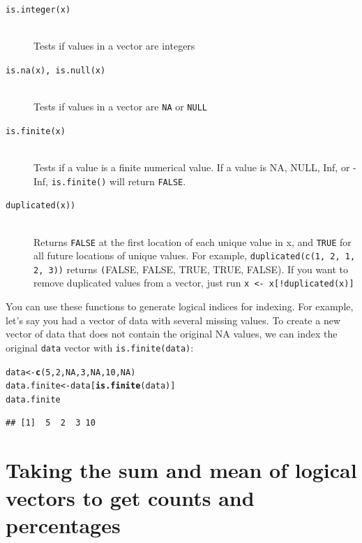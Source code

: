 \documentclass{tufte-book}\usepackage[]{graphicx}\usepackage[]{color}
\makeatletter
\newcommand{\hlnum}[1]{\textcolor[rgb]{0.686,0.059,0.569}{#1}}%
\newcommand{\hlstd}[1]{\textcolor[rgb]{0.345,0.345,0.345}{#1}}%
\newcommand{\hlkwb}[1]{\textcolor[rgb]{0.69,0.353,0.396}{#1}}%
\newcommand{\hlkwd}[1]{\textcolor[rgb]{0.737,0.353,0.396}{\textbf{#1}}}%
\newenvironment{kframe}{%
 \def\at@end@of@kframe{}%
 \ifinner\ifhmode%
  \def\at@end@of@kframe{\end{minipage}}%
  \begin{minipage}{\columnwidth}%
 \fi\fi%
 \def\FrameCommand##1{\hskip\@totalleftmargin \hskip-\fboxsep
 \colorbox{shadecolor}{##1}\hskip-\fboxsep
     \hskip-\linewidth \hskip-\@totalleftmargin \hskip\columnwidth}%
 \MakeFramed {\advance\hsize-\width
   \@totalleftmargin\z@ \linewidth\hsize
   \@setminipage}}%
 {\par\unskip\endMakeFramed%
 \at@end@of@kframe}
\newenvironment{knitrout}{}{} %
\makeatother
\begin{document}
\begin{footnotesize}
{{\begin{description}
\item[\tt{is.integer(x)}] \hfill \\
Tests if values in a vector are integers
\item[\tt{is.na(x), is.null(x)}] \hfill \\
Tests if values in a vector are \texttt{NA} or \texttt{NULL}
\item[\tt{is.finite(x)}] \hfill \\
 Tests if a value is a finite numerical value. If a value is NA, NULL, Inf, or -Inf, \texttt{is.finite()} will return \texttt{FALSE}. 
\item[\tt{duplicated(x))}] \hfill \\
Returns \texttt{FALSE} at the first location of each unique value in x, and \texttt{TRUE} for all future locations of unique values. For example, \texttt{duplicated(c(1, 2, 1, 2, 3))} returns \texttt(FALSE, FALSE, TRUE, TRUE, FALSE). If you want to remove duplicated values from a vector, just run \texttt{x <- x[!duplicated(x)]}
  
\end{description}

}
}
\vspace{5mm} %
  

  
  You can use these functions to generate logical indices for indexing. For example, let's say you had a vector of data with several missing values. To create a new vector of data that does not contain the original NA values, we can index the original \texttt{data} vector with \texttt{is.finite(data)}:
  
\begin{knitrout}
\color{fgcolor}\begin{kframe}
\begin{alltt}
\hlstd{data} \hlkwb{<-} \hlkwd{c}\hlstd{(}\hlnum{5}\hlstd{,} \hlnum{2}\hlstd{,} \hlnum{NA}\hlstd{,} \hlnum{3}\hlstd{,} \hlnum{NA}\hlstd{,} \hlnum{10}\hlstd{,} \hlnum{NA}\hlstd{)}
\hlstd{data.finite} \hlkwb{<-} \hlstd{data[}\hlkwd{is.finite}\hlstd{(data)]}
\hlstd{data.finite}
\end{alltt}
\begin{verbatim}
## [1]  5  2  3 10
\end{verbatim}
\end{kframe}
\end{knitrout}


\section{Taking the sum and mean of logical vectors to get counts and percentages}


\end{footnotesize}
\end{document}
